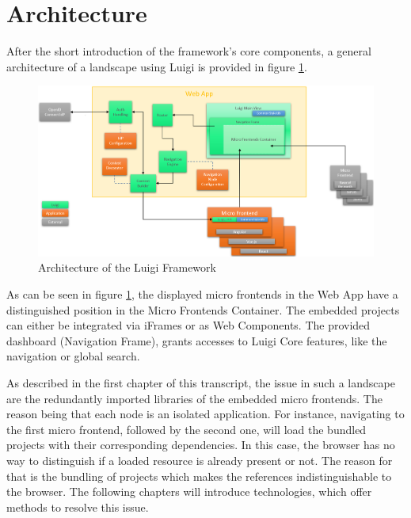 \section{Architecture}

After the short introduction of the framework's core components, a general architecture of a landscape using Luigi is provided in figure \ref{fig:luigi_architecture_fig}.

\begin{figure}[!h]
	\centering
	\includegraphics[width=1.05\textwidth]{Figures/Luigi_Architektur.png}
	\caption{Architecture of the Luigi Framework \cite{luigi_architecture}}
	\label{fig:luigi_architecture_fig}
\end{figure}

As can be seen in figure \ref{fig:luigi_architecture_fig}, the displayed micro frontends in the Web App have a distinguished position in the Micro Frontends Container. The embedded projects can either be integrated via iFrames or as Web Components.
The provided dashboard (Navigation Frame), grants accesses to Luigi Core features, like the navigation or global search.

As described in the first chapter of this transcript, the issue in such a landscape are the redundantly imported libraries of the embedded micro frontends. The reason being that each node is an isolated application.
For instance, navigating to the first micro frontend, followed by the second one, will load the bundled projects with their corresponding dependencies. In this case, the browser has no way to distinguish if a loaded resource is already present or not. The reason for that is the bundling of projects which makes the references indistinguishable to the browser.
The following chapters will introduce technologies, which offer methods to resolve this issue. 
 
